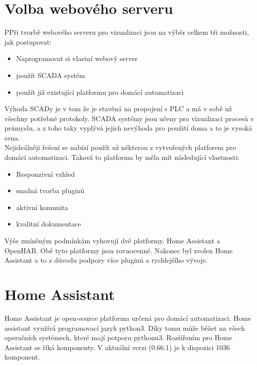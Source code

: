 \documentclass[a4paper,12pt,czech,bibliography=totoc]{scrbook}
\begin{document}
\section{Volba webového serveru}
PPři tvorbě webového serveru pro vizualizaci jsou na výběr celkem tři možnosti, jak postupovat:
\begin{itemize}
	\item Naprogramovat si vlastní webový server
	\item použít SCADA systém
	\item použít již existující platformu pro domácí automatizaci
\end{itemize}
Výhoda SCADy je v tom že je stavěná na propojení s PLC a má v sobě už všechny potřebné protokoly. SCADA systémy jsou učeny pro vizualizaci procesů v průmyslu, a z toho taky vyplývá jejich nevýhoda pro použití doma a to je vysoká cena.
\\
Nejideálněji řešení se nabízí použít už některou z vytvořených platforem pro domácí automatizaci. Taková to platforma by měla mít následující vlastnosti:
\begin{itemize}
	\item Responzivní vzhled
	\item snadná tvorba pluginů
	\item aktivní komunita
	\item kvalitní dokumentace
\end{itemize}
Výše zmíněným podmínkám vyhovují dvě platformy. Home Assistant a OpenHAB. 
Obě tyto platformy jsou rovnocenné. Nakonec byl zvolen Home Assistant a to z důvodu podpory více pluginů a rychlejšího vývoje. 
\section{Home Assistant}
Home Assistant je open-source platforma určená pro domácí automatizaci. Home assistant využívá programovací jazyk python3. Díky tomu může běžet na všech operačních systémech, které mají potporu pythonu3. Rozšířením pro Home Assistant se říká komponenty. V aktuální verzi (0.66.1) je k dispozici 1036 komponent. 
\cite{VCnCmsNRtY9uRcGa} 
\end{document}
